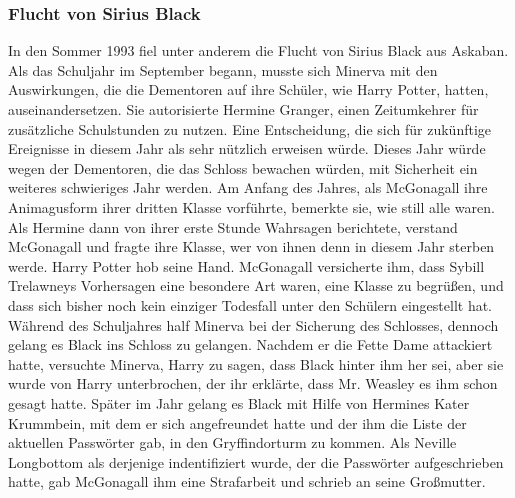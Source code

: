\documentclass[a4paper, 10pt]{article}
\begin{document}
\subsubsection*{\large Flucht von Sirius Black}
In den Sommer 1993 fiel unter anderem die Flucht von Sirius Black aus Askaban. Als das Schuljahr im September begann, musste sich Minerva mit den Auswirkungen, die die Dementoren auf ihre Schüler, wie Harry Potter, hatten, auseinandersetzen. Sie autorisierte Hermine Granger, einen Zeitumkehrer für zusätzliche Schulstunden zu nutzen. Eine Entscheidung, die sich für zukünftige Ereignisse in diesem Jahr als sehr nützlich erweisen würde. Dieses Jahr würde wegen der Dementoren, die das Schloss bewachen würden, mit Sicherheit ein weiteres schwieriges Jahr werden.
\vspace{10pt}
\newline
Am Anfang des Jahres, als McGonagall ihre Animagusform ihrer dritten Klasse vorführte, bemerkte sie, wie still alle waren. Als Hermine dann von ihrer erste Stunde Wahrsagen berichtete, verstand McGonagall und fragte ihre Klasse, wer von ihnen denn in diesem Jahr sterben werde. Harry Potter hob seine Hand. McGonagall versicherte ihm, dass Sybill Trelawneys Vorhersagen eine besondere Art waren, eine Klasse zu begrüßen, und dass sich bisher noch kein einziger Todesfall unter den Schülern eingestellt hat.
\vspace{10pt}
\newline
Während des Schuljahres half Minerva bei der Sicherung des Schlosses, dennoch gelang es Black ins Schloss zu gelangen. Nachdem er die Fette Dame attackiert hatte, versuchte Minerva, Harry zu sagen, dass Black hinter ihm her sei, aber sie wurde von Harry unterbrochen, der ihr erklärte, dass Mr. Weasley es ihm schon gesagt hatte. Später im Jahr gelang es Black mit Hilfe von Hermines Kater Krummbein, mit dem er sich angefreundet hatte und der ihm die Liste der aktuellen Passwörter gab, in den Gryffindorturm zu kommen. Als Neville Longbottom als derjenige indentifiziert wurde, der die Passwörter aufgeschrieben hatte, gab McGonagall ihm eine Strafarbeit und schrieb an seine Großmutter.
\vspace{10pt}
\newline
\end{document}
